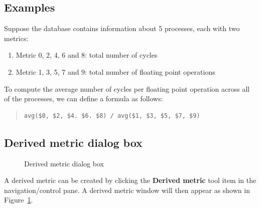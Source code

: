 
\subsection{Examples}

Suppose the database contains information about 5 processes, each with two metrics:
\begin{enumerate}
\item Metric 0, 2, 4, 6 and 8: total number of cycles
\item Metric 1, 3, 5, 7 and 9: total number of floating point operations
\end{enumerate}
To compute the average number of cycles per floating point operation across all of the processes, we can define a formula as follows:
\begin{quote}
\begin{verbatim}
avg($0, $2, $4. $6. $8) / avg($1, $3, $5, $7, $9)
\end{verbatim}
\end{quote}


\subsection{Derived metric dialog box}

\begin{figure}[t]
\caption{Derived metric dialog box}
\label{fig:hpcviewer-derived-dialog-box}
\end{figure}

A derived metric can be created by clicking the \textbf{Derived metric} tool item in the navigation/control pane.
A derived metric window will then appear as shown in Figure~\ref{fig:hpcviewer-derived-dialog-box}.


